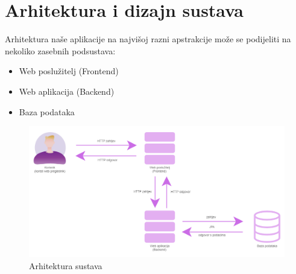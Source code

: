 \chapter{Arhitektura i dizajn sustava}
		

				
		Arhitektura naše aplikacije na najvišoj razni apstrakcije može se podijeliti na nekoliko zasebnih podsustava:
		\begin{itemize}
			\item Web poslužitelj (Frontend)
			\item Web aplikacija (Backend)
			\item Baza podataka
		\end{itemize}

		\begin{figure}[H]
			\includegraphics[width=\textwidth,height=0.4\textheight]{slike/Arhitektura.png}
			\centering
			\caption{Arhitektura sustava}
			\label{fig:Arhitektura}
		\end{figure}

